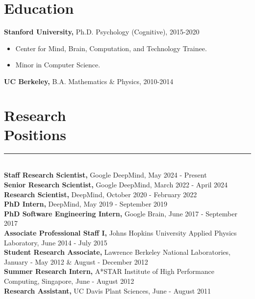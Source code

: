 \documentclass[margin]{res}
\begin{document}
 
 
 
\address{{\bf Email} \\ andrew.lampinen@gmail.com}
\address{{\bf Website} \\\url{https://lampinen.github.io}}
\begin{resume} 
\section{Education} 
{\bf Stanford University,} Ph.D. Psychology (Cognitive), 2015-2020
\begin{itemize} \itemsep -2pt \item Center for Mind, Brain, Computation, and Technology Trainee. \item Minor in Computer Science.\end{itemize}
{\bf UC Berkeley,}  B.A. Mathematics \& Physics, 2010-2014%
\vspace{1pt}\section{Research\\Positions} \vspace{-15pt} \rule{\textwidth}{0.5pt} \\[3pt]
{\bf Staff Research Scientist,} Google DeepMind, May 2024 - Present\\[0.1em] 
{\bf Senior Research Scientist,} Google DeepMind, March 2022 - April 2024\\[0.1em] 
{\bf Research Scientist,} DeepMind, October 2020 - February 2022\\[0.1em]
{\bf PhD Intern,} DeepMind, May 2019 - September 2019\\[0.1em]
{\bf PhD Software Engineering Intern,} Google Brain, June 2017 - September 2017\\[0.1em]
{\bf Associate Professional Staff I,} Johns Hopkins University Applied Physics Laboratory, June 2014 - July 2015\\[0.1em] 
{\bf Student Research Associate,} Lawrence Berkeley National Laboratories, January - May 2012 \& August - December 2012\\[0.1em]
{\bf Summer Research Intern,} A*STAR Institute of High Performance Computing, Singapore, June - August 2012\\[0.1em]
{\bf Research Assistant,} UC Davis Plant Sciences, June - August 2011
\vspace{1pt}

\end{resume}
\end{document}
